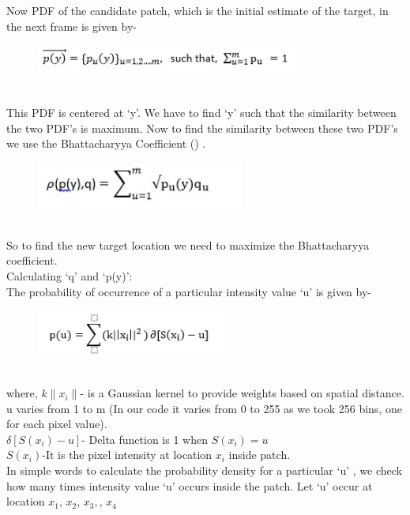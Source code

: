 \documentclass[a4paper,12pt,oneside]{book}
\begin{document}
    Now PDF of the candidate patch, which is the initial estimate of the target, in the next frame is given by-
     \begin{figure}[h!]
		\includegraphics[width=0.5\linewidth, height=1cm]{eq2.jpg}
	\end{figure}\\
	This PDF is centered at ‘y’.
    We have to find ‘y’ such that the similarity between the two PDF’s is maximum.
    Now to find the similarity between these two PDF’s we use the Bhattacharyya Coefficient (\rho ) .\\
   
    \begin{figure}[h!]
    \includegraphics[width=0.5\linewidth, height=1.5cm]{eq3.jpg}
	\end{figure}\\
	
	So to find the new target location we need to maximize the Bhattacharyya coefficient.\\
    Calculating ‘q’ and ‘p(y)’:\\
    The probability of occurrence of a particular intensity value ‘u’ is given by-\\
    \begin{figure}[h!]
    \includegraphics[width=0.5\linewidth, height=1.5cm]{eq4.jpg}
	\end{figure}\\
    where,
    $k\|x_i\|$- is a Gaussian kernel to provide weights based on spatial distance.
    u varies from 1 to m (In our code it varies from 0 to 255 as we took 256 bins, one for each pixel value).\\
    $ \delta [S(x_i )-u] $- Delta function is 1 when $S(x_i )=u$\\ 
    $S(x_i)$-It is the pixel intensity at location $x_i$ inside patch.\\
    
    In simple words to calculate the probability density for a particular ‘u’ , we check how many times intensity value ‘u’ occurs inside the patch. Let ‘u’ occur at location $x_1$, $x_2$, $x_3,$, $x_4$\\
    
\end{document}
